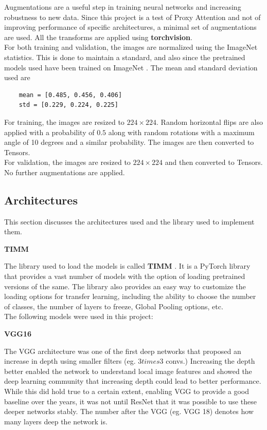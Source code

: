 Augmentations are a useful step in training neural networks and increasing robustness to new data. Since this project is a test of Proxy Attention and not of improving performance of specific architectures, a minimal set of augmentations are used. All the transforms are applied using \textbf{torchvision}.\\
For both training and validation, the images are normalized using the ImageNet statistics. This is done to maintain a standard, and also since the pretrained models used have been trained on ImageNet \cite{dengImageNetLargeScaleHierarchical2009}. The mean and standard deviation used are \begin{verbatim}
    mean = [0.485, 0.456, 0.406]
    std = [0.229, 0.224, 0.225]
\end{verbatim}
For training, the images are resized to $224\times224$. Random horizontal flips are also applied with a probability of $0.5$ along with random rotations with a maximum angle of 10 degrees and a similar probability. The images are then converted to Tensors.\\
For validation, the images are resized to $224\times224$ and then converted to Tensors. No further augmentations are applied.\\

\subsection{Architectures}
This section discusses the architectures used and the library used to implement them.

\textbf{TIMM}

The library used to load the models is called \textbf{TIMM} \cite{wightmanRwightmanPytorchimagemodelsV02023}. It is a PyTorch library that provides a vast number of models with the option of loading pretrained versions of the same. The library also provides an easy way to customize the loading options for transfer learning, including the ability to choose the number of classes, the number of layers to freeze, Global Pooling options, etc.\\
The following models were used in this project:

\textbf{VGG16}

The VGG architecture was one of the first deep networks that proposed an increase in depth using smaller filters (eg. $3 times 3$ convs.) Increasing the depth better enabled the network to understand local image features and showed the deep learning community that increasing depth could lead to better performance. While this did hold true to a certain extent, enabling VGG to provide a good baseline over the years, it was not until ResNet \cite{heDeepResidualLearning2016} that it was possible to use these deeper networks stably. The number after the VGG (eg. VGG 18) denotes how many layers deep the network is.

